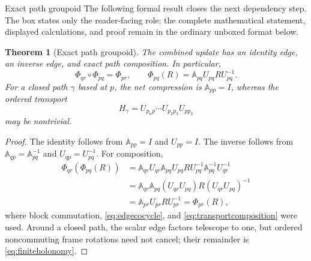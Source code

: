 \documentclass[11pt]{article}
\numberwithin{equation}{section}
\newtheorem{theorem}[definition]{Theorem}
\theoremstyle{remark}
\begin{document}
\begin{proofguide}{Exact path groupoid}
The following formal result closes the next dependency step. The box states only the reader-facing role; the complete mathematical statement, displayed calculations, and proof remain in the ordinary unboxed format below.
\end{proofguide}
\begin{theorem}[Exact path groupoid]
The combined update has an identity edge, an inverse edge, and exact path composition.  In particular,
\begin{equation}
\Phi_{qr}\circ\Phi_{pq}=\Phi_{pr},
\qquad
\Phi_{pq}(R)=\mathbb A_{pq}U_{pq}RU_{pq}^{-1}.
\label{eq:pathgroupoid}
\end{equation}
For a closed path $\gamma$ based at $p$, the net compression is $\mathbb A_{pp}=I$, whereas the ordered transport
\begin{equation}
H_\gamma=U_{p_np}\cdots U_{p_2p_3}U_{pp_2}
\label{eq:finiteholonomy}
\end{equation}
may be nontrivial.
\end{theorem}
\begin{proof}
The identity follows from $\mathbb A_{pp}=I$ and $U_{pp}=I$.  The inverse follows from $\mathbb A_{qp}=\mathbb A_{pq}^{-1}$ and $U_{qp}=U_{pq}^{-1}$.  For composition,
\begin{align}
\Phi_{qr}(\Phi_{pq}(R))
&=\mathbb A_{qr}U_{qr}\mathbb A_{pq}U_{pq}RU_{pq}^{-1}\mathbb A_{pq}^{-1}U_{qr}^{-1}\\
&=\mathbb A_{qr}\mathbb A_{pq}(U_{qr}U_{pq})R(U_{qr}U_{pq})^{-1}\\
&=\mathbb A_{pr}U_{pr}RU_{pr}^{-1}=\Phi_{pr}(R),
\end{align}
where block commutation, \eqref{eq:edgecocycle}, and \eqref{eq:transportcomposition} were used.  Around a closed path, the scalar edge factors telescope to one, but ordered noncommuting frame rotations need not cancel; their remainder is \eqref{eq:finiteholonomy}.
\end{proof}
\end{document}
